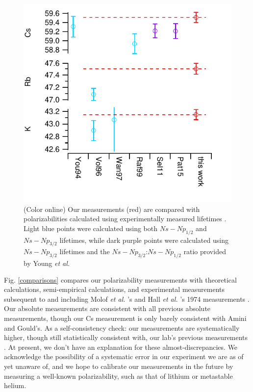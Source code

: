 \documentclass[twocolumn,prl,showpacs,superscriptaddress]{revtex4-1}   %
\newcommand{\figref}[1]{Fig. \ref{#1}}
\newcommand{\etal}{\textit{et al. }}
\begin{document}
\begin{figure}
\includegraphics[width=\linewidth,keepaspectratio]{displayLifeComps.pdf}
\caption{\label{comparisonsLifetimes}(Color online) Our measurements (red) are compared with polarizabilities calculated using experimentally measured lifetimes \cite{Young1994,Volz2006,Wang1997,Rafac1999,Sell2011,Patterson2015}. Light blue points were calculated using both $Ns-Np_{1/2}$ and $Ns-Np_{3/2}$ lifetimes, while dark purple points were calculated using $Ns-Np_{3/2}$ lifetimes and the $Ns-Np_{3/2}$:$Ns-Np_{1/2}$ ratio provided by Young \etal \cite{Young1994}}
\end{figure}

\figref{comparisons} compares our polarizability measurements with theoretical calculations, semi-empirical calculations, and experimental measurements subsequent to and including Molof \etal's and Hall \etal's 1974 measurements \cite{Molof1974,Hall1974}. Our absolute measurements are consistent with all previous absolute measurements, though our Cs measurement is only barely consistent with Amini and Gould's. As a self-consistency check: our measurements are systematically higher, though still statistically consistent with, our lab's previous measurements \cite{Holmgren2010}. At present, we don't have an explanation for these almost-discrepancies. We acknowledge the possibility of a systematic error in our experiment we are as of yet unaware of, and we hope to calibrate our measurements in the future by measuring a well-known polarizability, such as that of lithium or metastable helium.
\end{document}
